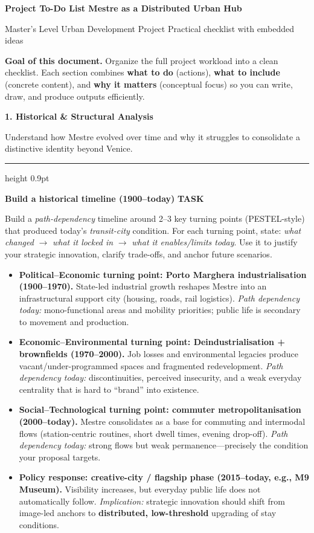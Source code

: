 \documentclass[10pt]{article}
\newcommand{\key}[1]{\textcolor{Accent}{\bfseries #1}}
\newcommand{\tag}[1]{\textcolor{Secondary}{\bfseries #1}}
\newcommand{\emphit}[1]{\textit{#1}}
\newcommand{\HeaderBar}[2]{%
  \noindent\colorbox{Primary}{%
    \parbox{\dimexpr\linewidth-2\fboxsep\relax}{%
      \vspace{3pt}%
      {\color{white}\fontsize{18}{21}\selectfont\bfseries #1\par}%
      \vspace{2pt}%
      {\color{white!85}\normalsize #2\par}%
      \vspace{3pt}%
    }%
  }\par
}
\newcommand{\SectionTitle}[2]{%
  \vspace{8pt}%
  {\color{Primary}\Large\bfseries #1\par}%
  \vspace{2pt}%
  {\color{Muted}\small #2\par}%
  \vspace{4pt}%
  {\color{Rule}\hrule height 0.9pt}\vspace{6pt}%
}
\newcommand{\MiniLabel}[1]{%
  \textcolor{Secondary}{\footnotesize\bfseries\MakeUppercase{#1}}%
}
\newcommand{\TodoBlock}[4]{%
  {\bfseries #1}\hfill{\MiniLabel{#2}}\par
  {\color{Muted}\small #3\par}
  \vspace{2pt}
  \begin{itemize}
    #4
  \end{itemize}
}
\begin{document}
\color{Text}

\HeaderBar{Project To-Do List \textendash{} Mestre as a Distributed Urban Hub}{Master’s Level Urban Development Project \textemdash{} Practical checklist with embedded ideas}

\vspace{6pt}

{\color{Muted}\small \textbf{Goal of this document.} Organize the full project workload into a clean checklist. Each section combines \key{what to do} (actions), \key{what to include} (concrete content), and \key{why it matters} (conceptual focus) so you can write, draw, and produce outputs efficiently.\par}

\SectionTitle{1. Historical \& Structural Analysis}{Understand how Mestre evolved over time and why it struggles to consolidate a distinctive identity beyond Venice.}

\TodoBlock{Build a historical timeline (1900--today)}{Task}{Build a \emphit{path-dependency} timeline around 2--3 key turning points (PESTEL-style) that produced today’s \emphit{transit-city} condition. For each turning point, state: \emphit{what changed} $\rightarrow$ \emphit{what it locked in} $\rightarrow$ \emphit{what it enables/limits today}. Use it to justify your strategic innovation, clarify trade-offs, and anchor future scenarios.}{%
  \item \tag{Political--Economic turning point: Porto Marghera industrialisation (1900--1970).} State-led industrial growth reshapes Mestre into an infrastructural support city (housing, roads, rail logistics). \emphit{Path dependency today:} mono-functional areas and mobility priorities; public life is secondary to movement and production.
  \item \tag{Economic--Environmental turning point: Deindustrialisation + brownfields (1970--2000).} Job losses and environmental legacies produce vacant/under-programmed spaces and fragmented redevelopment. \emphit{Path dependency today:} discontinuities, perceived insecurity, and a weak everyday centrality that is hard to ``brand'' into existence.
  \item \tag{Social--Technological turning point: commuter metropolitanisation (2000--today).} Mestre consolidates as a base for commuting and intermodal flows (station-centric routines, short dwell times, evening drop-off). \emphit{Path dependency today:} strong flows but weak permanence---precisely the condition your proposal targets.
  \item \tag{Policy response: creative-city / flagship phase (2015--today, e.g., \key{M9 Museum}).} Visibility increases, but everyday public life does not automatically follow. \emphit{Implication:} strategic innovation should shift from image-led anchors to \key{distributed, low-threshold} upgrading of stay conditions.
}
\end{document}
